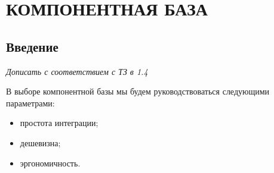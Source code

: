 \chapter{КОМПОНЕНТНАЯ БАЗА}
\section{Введение}
\textit{Дописать с соответствием с ТЗ в 1.4}

В выборе компонентной базы мы будем руководствоваться следующими параметрами:
\begin{itemize}
\item простота интеграции;
\item дешевизна;
\item эргономичность.
\end{itemize}

